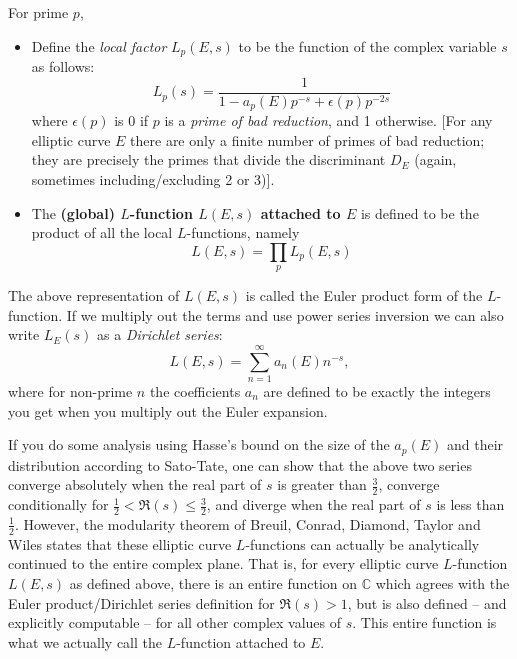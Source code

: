 \documentclass[10pt]{article}
\begin{document}
\begin{definition}  For prime $p$,
\begin{itemize}
\item Define the {\it local factor} $L_p(E,s)$ to be the function of the complex variable $s$ as follows:
\begin{equation}
L_p(s) = \frac{1}{1-a_p(E)p^{-s} + \epsilon(p)p^{-2s}}
\end{equation}
where $\epsilon(p)$ is 0 if $p$ is a {\it prime of bad reduction}, and 1 otherwise. [For any elliptic curve $E$ there are only a finite number of primes of bad reduction; they are precisely the primes that divide the discriminant $D_E$ (again, sometimes including/excluding 2 or 3)].
\item The {\bf (global) $L$-function $L(E,s)$ attached to $E$} is defined to be the product of all the local $L$-functions, namely
\begin{equation}
L(E,s)  = \prod_{p} L_p(E,s)
\end{equation}
\end{itemize}
\end{definition}
The above representation of $L(E,s)$ is called the Euler product form of the $L$-function. If we multiply out the terms and use power series inversion we can also write $L_E(s)$ as a {\it Dirichlet series}:
\begin{equation}
L(E,s) = \sum_{n=1}^{\infty} a_n(E) n^{-s},
\end{equation}
where for non-prime $n$ the coefficients $a_n$ are defined to be exactly the integers you get when you multiply out the Euler expansion.

If you do some analysis using Hasse's bound on the size of the $a_p(E)$ and their distribution according to Sato-Tate, one can show that the above two series converge absolutely when the real part of $s$ is greater than $\frac{3}{2}$, converge conditionally for $\frac{1}{2}<\Re(s)\le \frac{3}{2}$, and diverge when the real part of $s$ is less than $\frac{1}{2}$. However, the modularity theorem of Breuil, Conrad, Diamond, Taylor and Wiles \cite{BCDT-2011} \cite{TaWi-1995} \cite{Wil-1995} states that these elliptic curve $L$-functions can actually be analytically continued to the entire complex plane. That is, for every elliptic curve $L$-function $L(E,s)$ as defined above, there is an entire function on $\mathbb{C}$ which agrees with the Euler product/Dirichlet series definition for $\Re(s)>1$, but is also defined -- and explicitly computable -- for all other complex values of $s$. This entire function is what we actually call the $L$-function attached to $E$.
\end{document}
